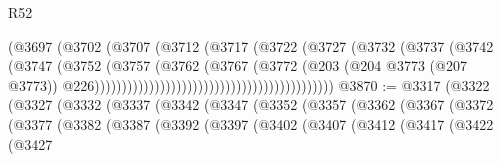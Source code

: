 \begin{lexlean}{R52}
\begin{coremodule}
{{{{{{{{{{{{{{{{{{{{{{{{{{{{{{{{{{{{{{{{{{{{{{{{{{{{{{{{{{{{{{{{{{{{{{{{{{{{{{{{{{{{{{{{{{{{{{{{{{{{{{{{{{{{{{{{{{{{{{{{{{{{{{{{{{{{{{{{{{{{{{{{{{{{{{{{{{{{{{{{{{{{{{{{{{{{{{{{{{{{{{{{{{{{{{{{{{{{{{                                                          (@3697
                                                            (@3702
                                                              (@3707
                                                                (@3712
                                                                  (@3717
                                                                    (@3722
                                                                      (@3727
                                                                        (@3732
                                                                          (@3737
                                                                            (@3742
                                                                              (@3747
                                                                                (@3752
                                                                                  (@3757
                                                                                    (@3762
                                                                                      (@3767
                                                                                        (@3772
                                                                                          (@203
                                                                                            (@204
                                                                                              @3773
                                                                                              (@207
                                                                                                @3773))
                                                                                            @226))))))))))))))))))))))))))))))))))))))))))))
@3870 := @3317
    (@3322
      (@3327
        (@3332
          (@3337
            (@3342
              (@3347
                (@3352
                  (@3357
                    (@3362
                      (@3367
                        (@3372
                          (@3377
                            (@3382
                              (@3387
                                (@3392
                                  (@3397
                                    (@3402
                                      (@3407
                                        (@3412
                                          (@3417
                                            (@3422
                                              (@3427
}}}}}}}}}}}}}}}}}}}}}}}}}}}}}}}}}}}}}}}}}}}}}}}}}}}}}}}}}}}}}}}}}}}}}}}}}}}}}}}}}}}}}}}}}}}}}}}}}}}}}}}}}}}}}}}}}}}}}}}}}}}}}}}}}}}}}}}}}}}}}}}}}}}}}}}}}}}}}}}}}}}}}}}}}}}}}}}}}}}}}}}}}}}}}}}}}}}}}}
\end{coremodule}
\end{lexlean}
